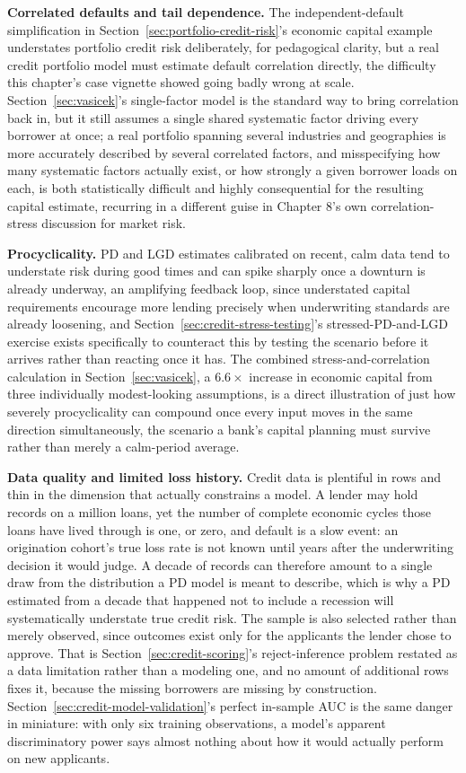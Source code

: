 \documentclass[../ai_in_finance]{subfiles}
\begin{document}
\textbf{Correlated defaults and tail dependence.} The independent-default simplification in Section~\ref{sec:portfolio-credit-risk}'s economic capital example understates portfolio credit risk deliberately, for pedagogical clarity, but a real credit portfolio model must estimate default correlation directly, the difficulty this chapter's case vignette showed going badly wrong at scale.
Section~\ref{sec:vasicek}'s single-factor model is the standard way to bring correlation back in, but it still assumes a single shared systematic factor driving every borrower at once; a real portfolio spanning several industries and geographies is more accurately described by several correlated factors, and misspecifying how many systematic factors actually exist, or how strongly a given borrower loads on each, is both statistically difficult and highly consequential for the resulting capital estimate, recurring in a different guise in Chapter 8's own correlation-stress discussion for market risk.

\textbf{Procyclicality.} PD and LGD estimates calibrated on recent, calm data tend to understate risk during good times and can spike sharply once a downturn is already underway, an amplifying feedback loop, since understated capital requirements encourage more lending precisely when underwriting standards are already loosening, and Section~\ref{sec:credit-stress-testing}'s stressed-PD-and-LGD exercise exists specifically to counteract this by testing the scenario before it arrives rather than reacting once it has.
The combined stress-and-correlation calculation in Section~\ref{sec:vasicek}, a $6.6\times$ increase in economic capital from three individually modest-looking assumptions, is a direct illustration of just how severely procyclicality can compound once every input moves in the same direction simultaneously, the scenario a bank's capital planning must survive rather than merely a calm-period average.

\textbf{Data quality and limited loss history.} Credit data is plentiful in rows and thin in the dimension that actually constrains a model. A lender may hold records on a million loans, yet the number of complete economic cycles those loans have lived through is one, or zero, and default is a slow event: an origination cohort's true loss rate is not known until years after the underwriting decision it would judge. A decade of records can therefore amount to a single draw from the distribution a PD model is meant to describe, which is why a PD estimated from a decade that happened not to include a recession will systematically understate true credit risk.
The sample is also selected rather than merely observed, since outcomes exist only for the applicants the lender chose to approve. That is Section~\ref{sec:credit-scoring}'s reject-inference problem restated as a data limitation rather than a modeling one, and no amount of additional rows fixes it, because the missing borrowers are missing by construction. Section~\ref{sec:credit-model-validation}'s perfect in-sample AUC is the same danger in miniature: with only six training observations, a model's apparent discriminatory power says almost nothing about how it would actually perform on new applicants.
\end{document}
